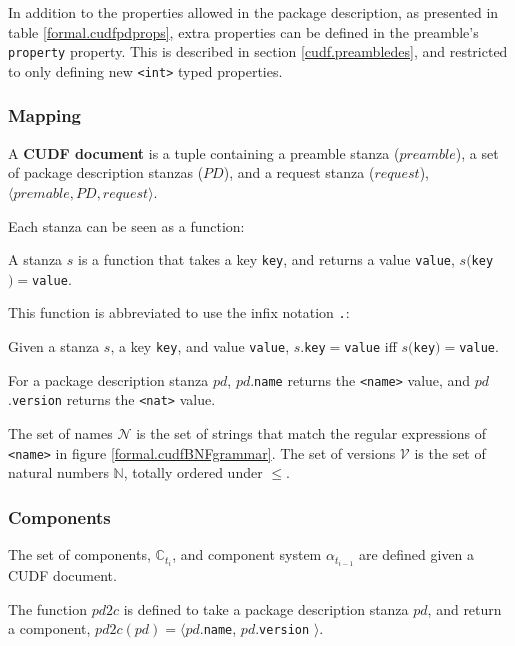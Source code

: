 In addition to the properties allowed in the package description, as presented in table \ref{formal.cudfpdprops}, extra properties can be defined in the preamble's \texttt{property} property.
This is described in section \ref{cudf.preambledes}, and restricted to only defining new \texttt{<int>} typed properties.

\subsubsection{Mapping}

\begin{defs}
A \textbf{CUDF document} is a tuple containing a preamble stanza ($preamble$), a set of package description stanzas ($PD$), and a request stanza ($request$), $\langle premable, PD, request \rangle$.
\end{defs}

Each stanza can be seen as a function:
\begin{defs}
A stanza $s$ is a function that takes a key \texttt{key}, and returns a value \texttt{value}, $s($\texttt{key}$) = $\texttt{value}. 
\end{defs}

This function is abbreviated to use the infix notation \texttt{.}:
\begin{defs}
Given a stanza $s$, a key \texttt{key}, and value \texttt{value}, $s$.\texttt{key}$ = $\texttt{value} iff $s($\texttt{key}$) = $\texttt{value}.
\end{defs}
For a package description stanza $pd$, $pd$.\texttt{name} returns the \texttt{<name>} value,
and $pd$.\texttt{version} returns the \texttt{<nat>} value.

The set of names $\mathcal{N}$ is the set of strings that match the regular expressions of \texttt{<name>} in figure \ref{formal.cudfBNFgrammar}.
The set of versions $\mathcal{V}$ is the set of natural numbers $\mathbb{N}$, totally ordered under $\leq$. 

\subsubsection{Components}
The set of components, $\mathbb{C}_{t_i}$, and component system $\alpha_{t_{i-1}}$ are defined given a CUDF document.

\begin{defs}
The function $pd2c$ is defined to take a package description stanza $pd$, and return a component, $pd2c(pd) = \langle pd.$\texttt{name}, $pd.$\texttt{version} $\rangle$.
\end{defs}


